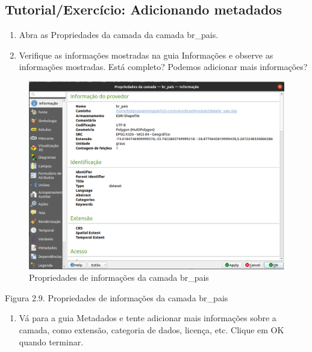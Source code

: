 \documentclass[
]{krantz}
\providecommand{\tightlist}{%
  \setlength{\itemsep}{0pt}\setlength{\parskip}{0pt}}
\begin{document}
\hypertarget{tutorialexercuxedcio-adicionando-metadados}{%
\subsection{Tutorial/Exercício: Adicionando metadados}\label{tutorialexercuxedcio-adicionando-metadados}}

\begin{enumerate}
\def\labelenumi{\arabic{enumi}.}
\tightlist
\item
  Abra as Propriedades da camada da camada br\_pais.
\item
  Verifique as informações mostradas na guia Informações e observe as informações mostradas. Está completo? Podemos adicionar mais informações?
\end{enumerate}

\begin{figure}
\centering
\includegraphics{media/modulo2/metadata-1.png}
\caption{Propriedades de informações da camada br\_pais}
\end{figure}

Figura 2.9. Propriedades de informações da camada br\_pais

\begin{enumerate}
\def\labelenumi{\arabic{enumi}.}
\setcounter{enumi}{2}
\tightlist
\item
  Vá para a guia Metadados e tente adicionar mais informações sobre a camada, como extensão, categoria de dados, licença, etc. Clique em OK quando terminar.
\end{enumerate}
\end{document}
